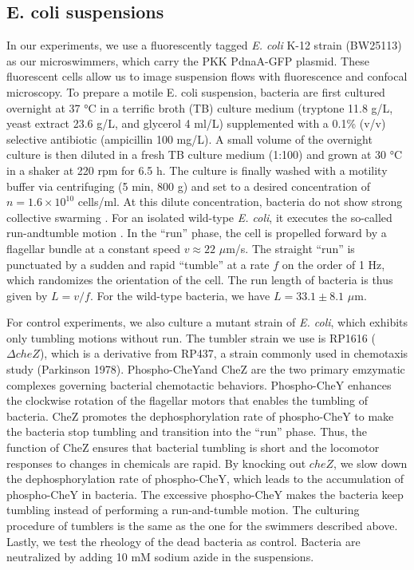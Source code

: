 \subsection{E. coli suspensions}
In our experiments, we use a fluorescently tagged \textit{E. coli} K-12 strain (BW25113) as our microswimmers, which carry the
PKK PdnaA-GFP plasmid. These fluorescent cells allow us to image suspension flows with fluorescence and confocal microscopy. To prepare a motile E. coli suspension, bacteria are first cultured overnight at 37 °C in a terrific broth (TB) culture medium (tryptone 11.8 g/L, yeast extract 23.6 g/L, and glycerol 4 ml/L) supplemented with a 0.1\% (v/v) selective antibiotic (ampicillin 100 mg/L). A small volume of the overnight culture is then diluted in a fresh TB culture medium (1:100) and grown at 30 °C in a shaker at 220 rpm for 6.5 h. The culture is finally washed with a motility buffer via centrifuging (5 min, 800 g) and set to a desired concentration of $n = 1.6 \times 10^{10}$ cells/ml. At this dilute concentration, bacteria do not show strong collective swarming \cite{Guo2018}. For an isolated wild-type \textit{E. coli}, it executes the so-called run-andtumble motion \cite{Berg2004}. In the ``run'' phase, the cell is propelled forward by a flagellar bundle at a constant speed $v \approx 22$ $\mu$m/s. The straight ``run'' is punctuated by a sudden and rapid ``tumble'' at a rate $f$ on the order of 1 Hz, which randomizes the orientation of the cell. The run length of bacteria
is thus given by $L = v/f$. For the wild-type bacteria, we have $L = 33.1 \pm 8.1$ $\mu$m.

For control experiments, we also culture a mutant strain of \textit{E. coli}, which exhibits only tumbling motions without run. The tumbler strain we use is RP1616 ($\Delta cheZ$), which is a derivative from RP437, a strain commonly used in chemotaxis study \cite{Parkinson1978} (Parkinson 1978). Phospho-CheYand CheZ are the two primary emzymatic complexes governing bacterial chemotactic behaviors. Phospho-CheY enhances the clockwise rotation of the flagellar motors that enables the tumbling of bacteria. CheZ promotes the dephosphorylation rate of phospho-CheY to make the bacteria stop tumbling and transition into the ``run'' phase. Thus, the function of CheZ ensures that bacterial tumbling is short and the locomotor responses to changes in chemicals are rapid. By knocking out $cheZ$, we slow down the dephosphorylation rate of phospho-CheY, which leads to the accumulation of phospho-CheY in bacteria. The excessive phospho-CheY makes the bacteria keep tumbling instead of performing a run-and-tumble motion. The culturing procedure of tumblers is the same as the one for the swimmers described above. Lastly, we test the rheology of the dead bacteria as control. Bacteria are neutralized by adding 10 mM sodium azide in the suspensions.

